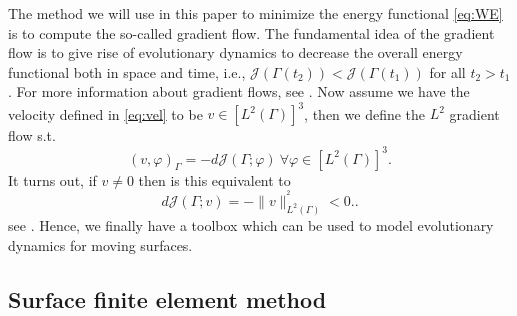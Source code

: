 The method we will use in this paper to minimize the energy functional \eqref{eq:WE} is to compute the so-called gradient flow. The fundamental idea of the gradient flow is to give rise of evolutionary dynamics to decrease the overall energy
functional both in space and time, i.e., $\mathcal{J}\left( \Gamma \left( t_{2} \right)  \right) <   \mathcal{J}\left( \Gamma \left( t_{1} \right)\right)$ for all  $t_{2} > t_{1}$. For more information about gradient flows, see
    \cite{dogan2007discrete, dogan2005finite}. Now assume we have the velocity defined in \eqref{eq:vel} to be $v \in \left[ L^{2}\left( \Gamma  \right)  \right]^3 $, then we define the $L^2$  gradient flow s.t. \[
      \left( v,\varphi  \right) _{\Gamma  }  = - d \mathcal{J} \left( \Gamma ; \varphi  \right) \  \forall \varphi \in \left[ L^2\left( \Gamma  \right)   \right] ^3.
    \]
    It turns out, if $v \neq 0$ then is this equivalent to
    \begin{equation}
    \label{eq:gradient_flow}
d \mathcal{J} \left( \Gamma ; v \right) = -\| v \|_{ L^2\left( \Gamma  \right)  }^{^2  } < 0.
    .\end{equation}
see \cite{ito2008variational}.
Hence, we finally have a toolbox which can be used to model evolutionary dynamics for moving surfaces.


\subsection{Surface finite element method}%
\label{sub:surface_finite_element_method}









